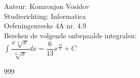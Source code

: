 \documentclass[a4paper]{article}
\newcommand{\dint}{\displaystyle\int}
\begin{document}
	
	\noindent \large Auteur: Komronjon Vosidov \\
	\noindent \large Studierichting: Informatica\\
	\noindent \large Oefeningenreeks 4A nr. 4.9\\
	
	
	\medskip
	\normalsize
	Bereken de volgende onbepaalde integralen:\\
	
$ \dint \dfrac{x \sqrt[3]{x}}{\sqrt[6]{x}}  dx = \dfrac{6}{13} x^{\tfrac{13}{6}} + C $
	
	
	
	
	
	
	
	\begin{thebibliography}{999}
	\end{thebibliography}		
\end{document}
